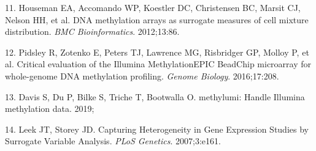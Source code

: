 \documentclass[]{article}
\begin{document}
\leavevmode\hypertarget{ref-Houseman2012}{}%
11. Houseman EA, Accomando WP, Koestler DC, Christensen BC, Marsit CJ,
Nelson HH, et al. DNA methylation arrays as surrogate measures of cell
mixture distribution. \emph{BMC Bioinformatics}. 2012;13:86.

\leavevmode\hypertarget{ref-Pidsley2016}{}%
12. Pidsley R, Zotenko E, Peters TJ, Lawrence MG, Risbridger GP, Molloy
P, et al. Critical evaluation of the Illumina MethylationEPIC BeadChip
microarray for whole-genome DNA methylation profiling. \emph{Genome
Biology}. 2016;17:208.

\leavevmode\hypertarget{ref-Davis2019}{}%
13. Davis S, Du P, Bilke S, Triche T, Bootwalla O. methylumi: Handle
Illumina methylation data. 2019;

\leavevmode\hypertarget{ref-Leek2007}{}%
14. Leek JT, Storey JD. Capturing Heterogeneity in Gene Expression
Studies by Surrogate Variable Analysis. \emph{PLoS Genetics}.
2007;3:e161.
\end{document}
